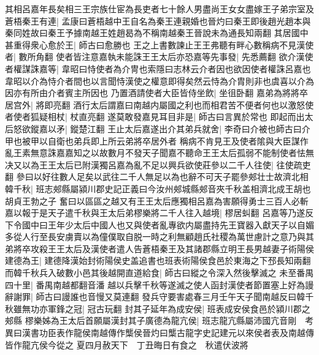 其相呂嘉年長矣相三王宗族仕宦為長吏者七十餘人男盡尚王女女盡嫁王子弟宗室及蒼梧秦王有連|{
	孟康曰蒼梧越中王自名為秦王連親婚也晉灼曰秦王即後趙光趙本與秦同姓故曰秦王予據南越王姓趙曷為不稱南越秦王晉說未為通長知兩翻}
其居國中甚重得衆心愈於王|{
	師古曰愈勝也}
王之上書數諫止王王弗聽有畔心數稱病不見漢使者|{
	數所角翻}
使者皆注意嘉執未能誅王王太后亦恐嘉等先事發|{
	先悉薦翻}
欲介漢使者權謀誅嘉等|{
	韋昭曰恃使者為介冑也索隱曰志林云介者因也欲因使者權誅呂嘉也韋昭以介為恃介者間也以言聞恃漢使之權意即得矣然云恃為介胄則非也虞喜以介為因亦有所由介者賓主所因也}
乃置酒請使者大臣皆侍坐飲|{
	坐徂卧翻}
嘉弟為將將卒居宫外|{
	將即亮翻}
酒行太后謂嘉曰南越内屬國之利也而相君苦不便者何也以激怒使者使者狐疑相杖|{
	杖直亮翻}
遂莫敢發嘉見耳目非是|{
	師古曰言異於常也}
即起而出太后怒欲鏦嘉以矛|{
	鏦楚江翻}
王止太后嘉遂出介其弟兵就舍|{
	李奇曰介被也師古曰介甲也被甲以自衛也弟兵即上所云弟將卒居外者}
稱病不肯見王及使者隂與大臣謀作亂王素無意誅嘉嘉知之以故數月不發天子聞嘉不聽命王王太后孤弱不能制使者怯無决又以為王王太后已附漢獨呂嘉為亂不足以興兵欲使莊參以二千人往使|{
	往使疏吏翻}
參曰以好往數人足矣以武往二千人無足以為也辭不可天子罷參郟壮士故濟北相韓千秋|{
	班志郟縣屬潁川郡史記正義曰今汝州郟城縣郟音夾千秋盖相濟北成王胡也胡貞王勃之子}
奮曰以區區之越又有王王太后應獨相呂嘉為害願得勇士三百人必斬嘉以報于是天子遣千秋與王太后弟樛樂將二千人往入越境|{
	樛居虯翻}
呂嘉等乃遂反下令國中曰王年少太后中國人也又與使者亂專欲内屬盡持先王寶器入獻天子以自媚多從人行至長安虜賣以為僮僕取自脱一時之利無顧趙氏社稷為萬世慮計之意乃與其弟將卒攻殺王王太后及漢使者遣人告蒼梧秦王及其諸郡縣立明王長男越妻子術陽侯建德為王|{
	建德降漢始封術陽侯史盖追書也班表術陽侯食邑於東海之下邳長知兩翻}
而韓千秋兵入破數小邑其後越開直道給食|{
	師古曰縱之令深入然後擊滅之}
未至番禺四十里|{
	番禺南越都翻音潘}
越以兵擊千秋等遂滅之使人函封漢使者節置塞上好為謾辭謝罪|{
	師古曰謾誰也音慢又莫連翻}
發兵守要害處春三月壬午天子聞南越反曰韓千秋雖無功亦軍鋒之冠|{
	冠古玩翻}
封其子延年為成安侯|{
	班表成安侯食邑於潁川郡之郟縣}
樛樂姊為王太后首願屬漢封其子廣德為龍亢侯|{
	班志龍亢縣屬沛國亢音剛　考異曰漢書功臣表作龍侯南越傳作㰍侯晉灼曰㰍古龍字史記建元以來侯者表及南越傳皆作龍亢侯今從之}
夏四月赦天下　丁丑晦日有食之　秋遣伏波將

